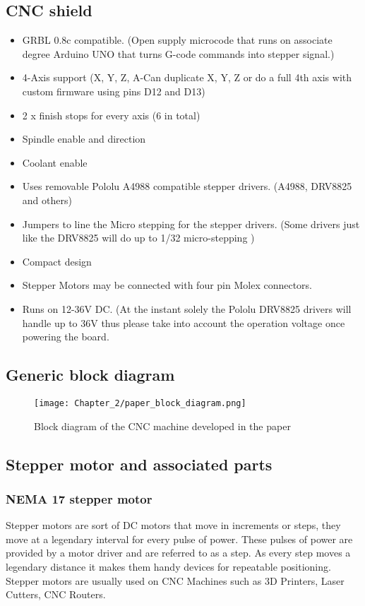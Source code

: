 \subsection{CNC shield}
\begin{itemize}
 \item GRBL 0.8c compatible. (Open supply microcode that runs on associate degree Arduino UNO that turns G-code commands into stepper signal.)
 \item 4-Axis support (X, Y, Z, A-Can duplicate X, Y, Z or do a full 4th axis with custom firmware using pins D12 and D13)
 \item 2 x finish stops for every axis (6 in total)
 \item Spindle enable and direction
 \item Coolant enable
 \item Uses removable Pololu A4988 compatible stepper drivers. (A4988, DRV8825 and others)
 \item Jumpers to line the Micro stepping for the stepper drivers. (Some drivers just like the DRV8825 will do up to 1/32 micro-stepping )
 \item Compact design
 \item Stepper Motors may be connected with four pin Molex connectors.
 \item Runs on 12-36V DC. (At the instant solely the Pololu DRV8825 drivers will handle up to 36V thus please take into account the operation voltage once powering the board.
\end{itemize}

\subsection{Generic block diagram}

\begin{figure}[h]
 \centering
 \texttt{[image: Chapter\_2/paper\_block\_diagram.png]}
 \caption{Block diagram of the CNC machine developed in the paper}
 \label{fig:block_diagram}
\end{figure}

\subsection{Stepper motor and associated parts}

\subsubsection*{NEMA 17 stepper motor}
Stepper motors are sort of DC motors that move in increments or steps, they move at a legendary interval for every pulse of power. These pulses of power are provided by a motor driver and are referred to as a step. As every step moves a legendary distance it makes them handy devices for repeatable positioning. Stepper motors are usually used on CNC Machines such as 3D Printers, Laser Cutters, CNC Routers.


